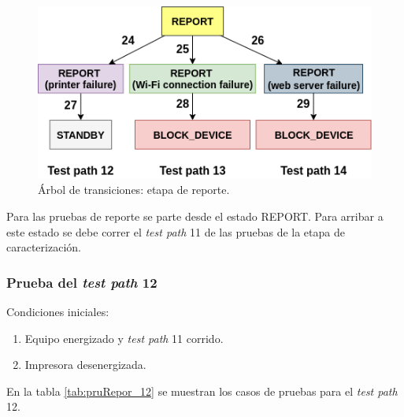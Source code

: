 \begin{figure}[htpb]
	\centering
	\includegraphics[scale=1]{./Figures/ArTrans_4.png}
	\caption{Árbol de transiciones: etapa de reporte.}
	\label{fig:ArTrans_4}
\end{figure}

Para las pruebas de reporte se parte desde el estado REPORT. Para arribar a este estado se debe correr el \textit{test path} 11 de las pruebas de la etapa de caracterización.

\subsubsection{Prueba del \textit{test path} 12}
\label{subsubsec:pruRepor_12}

Condiciones iniciales: 

\begin{enumerate}
	\item Equipo energizado y \textit{test path} 11 corrido.
	\item Impresora desenergizada.
\end{enumerate}

En la tabla \ref{tab:pruRepor_12} se muestran los casos de pruebas para el \textit{test path} 12.

\pagebreak


